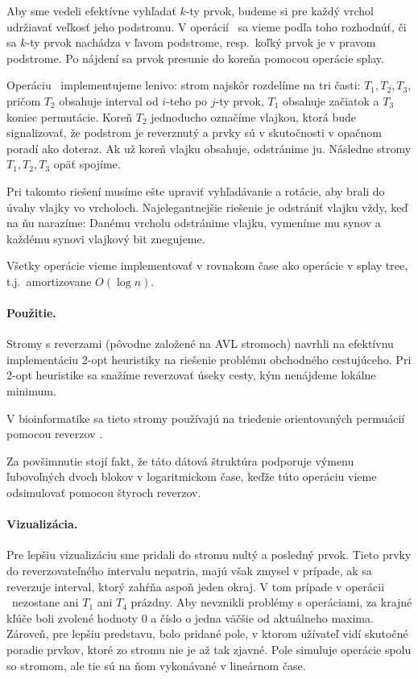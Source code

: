 
Aby sme vedeli efektívne vyhľadať $k$-ty prvok, budeme si pre každý vrchol udržiavať veľkosť jeho
podstromu. V operácií \find\ sa vieme podľa toho rozhodnúť, či sa $k$-ty prvok nachádza v ľavom podstrome,
resp.\ koľký prvok je v pravom podstrome. Po nájdení sa prvok presunie do koreňa pomocou operácie splay.

Operáciu \reverse\ implementujeme lenivo:
strom najskôr rozdelíme na tri časti: $T_1,T_2,T_3$, pričom $T_2$ obsahuje interval od $i$-teho
po $j$-ty prvok, $T_1$ obsahuje začiatok a $T_3$ koniec permutácie. Koreň $T_2$ jednoducho
označíme vlajkou, ktorá bude signalizovať, že podstrom je reverznutý a prvky sú v skutočnosti
v opačnom poradí ako doteraz. Ak už koreň vlajku obsahuje, odstránime ju.
Následne stromy $T_1,T_2,T_3$ opäť spojíme.

Pri takomto riešení musíme ešte upraviť vyhľadávanie a rotácie, aby brali do úvahy vlajky vo vrcholoch.
Najelegantnejšie riešenie je odstrániť vlajku vždy, keď na ňu narazíme:
Danému vrcholu odstránime vlajku, vymeníme mu synov a každému synovi vlajkový bit znegujeme.

Všetky operácie vieme implementovať v rovnakom čase ako operácie v splay tree, t.j.\ amortizovane $O(\log n)$.

\paragraph{Použitie.}
Stromy s reverzami (pôvodne založené na AVL stromoch) navrhli \citet{chrobak}
na efektívnu implementáciu 2-opt heuristiky na riešenie problému obchodného cestujúceho.
Pri 2-opt heuristike sa snažíme reverzovať úseky cesty, kým nenájdeme lokálne minimum.

V bioinformatike sa tieto stromy používajú na triedenie orientovaných permuácií
pomocou reverzov \citep{reversals, reversals2}.

Za povšimnutie stojí fakt, že táto dátová štruktúra podporuje výmenu ľubovoľných dvoch blokov
v logaritmickom čase, keďže túto operáciu vieme odsimulovať pomocou štyroch reverzov.

\paragraph{Vizualizácia.}
Pre lepšiu vizualizáciu sme pridali do stromu nultý a posledný prvok. Tieto prvky
do reverzovateľného intervalu nepatria, majú však zmysel v prípade, ak sa reverzuje
interval, ktorý zahŕňa aspoň jeden okraj. V tom prípade v operácii \reverse\ nezostane
ani $T_1$ ani $T_4$ prázdny. Aby nevznikli problémy s operáciami, za krajné kľúče boli
zvolené hodnoty $0$ a číslo o jedna väčšie od aktuálneho maxima. Zároveň, pre lepšiu
predstavu, bolo pridané pole, v ktorom užívateľ vidí skutočné poradie prvkov, ktoré
zo stromu nie je až tak zjavné. Pole simuluje operácie spolu so stromom, ale tie sú
na ňom vykonávané v lineárnom čase.